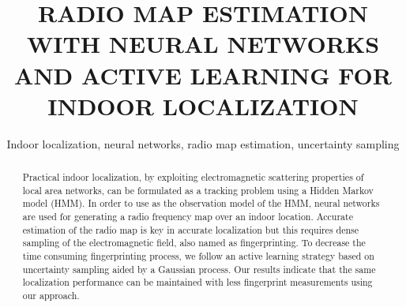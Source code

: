 \documentclass[conference]{IEEEtran}
\begin{document}
\title{RADIO MAP ESTIMATION WITH NEURAL NETWORKS AND ACTIVE LEARNING FOR INDOOR LOCALIZATION}

\author{
\and
{}
\and
{}

\maketitle
	\begin{abstract}
		Practical indoor localization, by exploiting electromagnetic scattering properties of local area networks, can be formulated as a tracking problem using a Hidden Markov model (HMM). In order to use as the observation model of the HMM, neural networks are used for generating a radio frequency map over an indoor location. Accurate estimation of the radio map is key in accurate localization but this requires dense sampling of the electromagnetic field, also named as fingerprinting. To decrease the time consuming fingerprinting process, we follow an active learning strategy based on uncertainty sampling aided by a Gaussian process. Our results indicate that the same localization performance can be maintained with less fingerprint measurements using our approach.
	\end{abstract}
	
	\begin{IEEEkeywords}
		Indoor localization, neural networks, radio map estimation, uncertainty sampling
	\end{IEEEkeywords}
}
\end{document}
